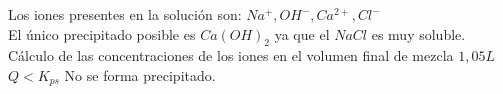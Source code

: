     Los iones presentes en la solución son: $Na^+, OH^-, Ca^{2+}, Cl^-$ \\
    El único precipitado posible es $Ca(OH)_2$ ya que el $NaCl$ es muy soluble.
    Cálculo de las concentraciones de los iones en el volumen final de mezcla $1,05L$
    \columnbreak{}
    $Q<K_{ps}$ No se forma precipitado.
    
